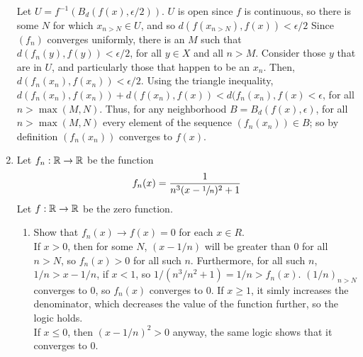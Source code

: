 \documentclass[12pt,letterpaper]{article}
\begin{document}
\begin{enumerate}
  Let $U=f^{-1}(B_d(f(x), \epsilon/2))$. $U$ is open since $f$ is continuous, so there is some $N$ for which $x_{n>N}\in U$, and so $d(f(x_{n>N}),f(x))<\epsilon/2$ Since $(f_n)$ converges uniformly, there is an $M$ such that $d(f_n(y),f(y)) < \epsilon/2$, for all $y\in X$ and all $n>M$. Consider those $y$ that are in $U$, and particularly those that happen to be an $x_n$. Then, $d(f_n(x_n),f(x_n))<\epsilon/2$. Using the triangle inequality, $d(f_n(x_n),f(x_n)) + d(f(x_n), f(x)) < d(f_n(x_n), f(x) < \epsilon$, for all $n > \max(M,N)$. Thus, for any neighborhood $B = B_d(f(x), \epsilon)$, for all $n>\max(M,N)$ every element of the sequence $(f_n(x_n))\in B$; so by definition $(f_n(x_n))$ converges to $f(x)$.
  \item Let $f_n: \mathbb{R} \rightarrow \mathbb{R}$ be the function $$f_n(x) = \frac{1}{n^3(x-\sfrac{1}{n})^2+1}$$ Let $f: \mathbb{R} \rightarrow \mathbb{R}$ be the zero function.
  \begin{enumerate}
    \item Show that $f_n(x)\rightarrow f(x)=0$ for each $x\in R$.\\
    If $x>0$, then for some $N$, $(x-1/n)$ will be greater than $0$ for all $n>N$, so $f_n(x)>0$ for all such $n$. Furthermore, for all such $n$, $1/n > x-1/n$, if $x<1$, so $1/(n^3/n^2+1) = 1/n > f_n(x)$. $(1/n)_{n>N}$ converges to $0$, so $f_n(x)$ converges to $0$. If $x\geq 1$, it simly increases the denominator, which decreases the value of the function further, so the logic holds. \\
    If $x\leq 0$, then $(x-1/n)^2>0$ anyway, the same logic shows that it converges to $0$.

\end{enumerate}
\end{enumerate}
\end{document}
